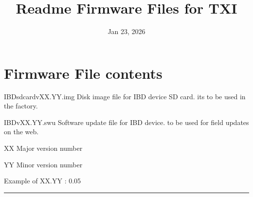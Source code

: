\documentclass[letterpaper,10pt,english]{sphinxhowto}
\title{Readme Firmware Files for TXI}
\date{Jan 23, 2026}
\author{}
\begin{document}
\pagestyle{empty}

\pagestyle{plain}

\pagestyle{normal}
\label{\detokenize{index::doc}}


\sphinxstepscope


\section{Firmware File contents}
\label{\detokenize{topics/readme_fwf:firmware-file-contents}}\label{\detokenize{topics/readme_fwf::doc}}
\sphinxAtStartPar
IBD\sphinxhyphen{}sdcard\sphinxhyphen{}vXX.YY.img \sphinxhyphen{} Disk image file for IBD device SD card. its to be used in the factory.

\sphinxAtStartPar
IBD\sphinxhyphen{}vXX.YY.swu \sphinxhyphen{} Software update file for IBD device. to be used for field updates on the web.

\sphinxAtStartPar
XX \sphinxhyphen{} Major version number

\sphinxAtStartPar
YY \sphinxhyphen{} Minor version number

\sphinxAtStartPar
Example of XX.YY : 0.05


\bigskip\hrule\bigskip




\renewcommand{\indexname}{Index}
\printindex
\end{document}
